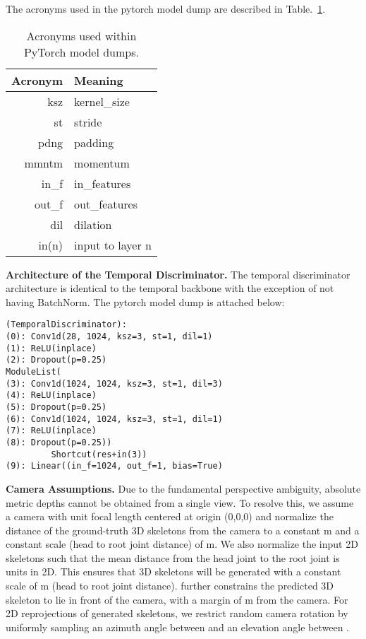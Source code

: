 \documentclass[10pt,twocolumn,letterpaper]{article}
\begin{document}
The acronyms used in the pytorch model dump are described in Table.~\ref{tab:acronym}.
\begin{table}[h]
	\centering
	\begin{tabular}{r|l}
		\hline
		\textbf{Acronym} & \textbf{Meaning} \\
		\hline
		ksz & kernel\_size \\ \hline
		st & stride \\ \hline
		pdng & padding \\ \hline
		mmntm & momentum\\ \hline
		in\_f & in\_features \\ \hline
		out\_f & out\_features \\ \hline
		dil & dilation \\ \hline
		in(n) & input to layer n \\ \hline
	\end{tabular}
	\caption{Acronyms used within PyTorch model dumps.}
	\label{tab:acronym}
\end{table}

\noindent \textbf{Architecture of the Temporal Discriminator.}
The temporal discriminator architecture is identical to the temporal backbone with the exception of not having BatchNorm. The pytorch model dump is attached below: 
\begin{lstlisting}
(TemporalDiscriminator): 
(0): Conv1d(28, 1024, ksz=3, st=1, dil=1)
(1): ReLU(inplace)
(2): Dropout(p=0.25)
ModuleList(
(3): Conv1d(1024, 1024, ksz=3, st=1, dil=3)
(4): ReLU(inplace)
(5): Dropout(p=0.25)
(6): Conv1d(1024, 1024, ksz=3, st=1, dil=1)
(7): ReLU(inplace)
(8): Dropout(p=0.25))
		 Shortcut(res+in(3))
(9): Linear((in_f=1024, out_f=1, bias=True) 
\end{lstlisting}

\noindent \textbf{Camera Assumptions.}
Due to the fundamental perspective ambiguity, absolute metric depths cannot be obtained from a single view. To resolve this, we assume a camera with unit focal length centered at origin (0,0,0) and normalize the distance of the ground-truth 3D skeletons from the camera to a constant m and a constant scale (head to root joint distance) of m. We also normalize the input 2D skeletons such that the mean distance from the head joint to the root joint is  units in 2D. This ensures that 3D skeletons will be generated with a constant scale of  m (head to root joint distance).  further constrains the predicted 3D skeleton to lie in front of the camera, with a margin of m from the camera. For 2D reprojections of generated skeletons, we restrict random camera rotation by uniformly sampling an azimuth angle between  and an elevation angle between .  \\
\end{document}
